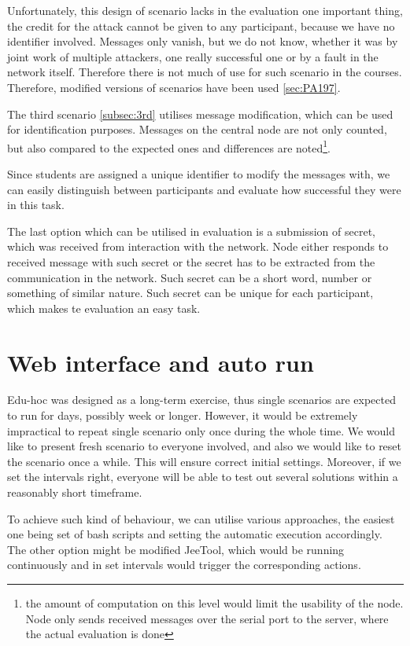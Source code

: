 \documentclass[
  print, %
  Table,   %
  nolof,     %
  nolot,     %
           oneside
]{fithesis3}
\begin{document}
  Unfortunately, this design of scenario lacks in the evaluation one important thing, the credit for the attack cannot be given to any participant, because we have no identifier involved. Messages only vanish, but we do not know, whether it was by joint work of multiple attackers, one really successful one or by a fault in the network itself. Therefore there is not much of use for such scenario in the courses. Therefore, modified versions of scenarios have been used \ref{sec:PA197}.

  The third scenario \ref{subsec:3rd} utilises message modification, which can be used for identification purposes. Messages on the central node are not only counted, but also compared to the expected ones and differences are noted\footnote{the amount of computation on this level would limit the usability of the node. Node only sends received messages over the serial port to the server, where the actual evaluation is done}.

  Since students are assigned a unique identifier to modify the messages with, we can easily distinguish between participants and evaluate how successful they were in this task.

  The last option which can be utilised in evaluation is a submission of secret, which was received from interaction with the network. Node either responds to received message with such secret or the secret has to be extracted from the communication in the network. Such secret can be a short word, number or something of similar nature. Such secret can be unique for each participant, which makes te evaluation an easy task.

  \section{Web interface and auto run}
  Edu-hoc was designed as a long-term exercise, thus single scenarios are expected to run for days, possibly week or longer. However, it would be extremely impractical to repeat single scenario only once during the whole time. We would like to present fresh scenario to everyone involved,  and also we would like to reset the scenario once a while. This will ensure correct initial settings. Moreover, if we set the intervals right, everyone will be able to test out several solutions within a reasonably short timeframe.

  To achieve such kind of behaviour, we can utilise various approaches, the easiest one being set of bash scripts and setting the automatic execution   accordingly. The other option might be modified JeeTool, which would be running continuously and in set intervals would trigger the corresponding actions.
\end{document}
